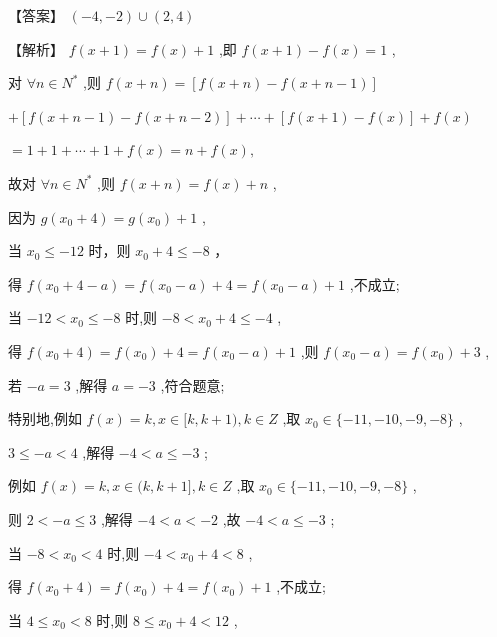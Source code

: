 \documentclass[10pt]{article}
\begin{document}
【答案】 \(\left( {-4, - 2}\right)  \cup  \left( {2,4}\right)\)

【解析】 \(f\left( {x + 1}\right)  = f\left( x\right)  + 1\) ,即 \(f\left( {x + 1}\right)  - f\left( x\right)  = 1\) ,

对 \(\forall n \in  {N}^{ * }\) ,则 \(f\left( {x + n}\right)  = \left\lbrack  {f\left( {x + n}\right)  - f\left( {x + n - 1}\right) }\right\rbrack\)

\(+ \left\lbrack  {f\left( {x + n - 1}\right)  - f\left( {x + n - 2}\right) }\right\rbrack   + \cdots  + \left\lbrack  {f\left( {x + 1}\right)  - f\left( x\right) }\right\rbrack   + f\left( x\right)\)

\(= 1 + 1 + \cdots  + 1 + f\left( x\right)  = n + f\left( x\right) ,\)

故对 \(\forall n \in  {N}^{ * }\) ,则 \(f\left( {x + n}\right)  = f\left( x\right)  + n\) ,

因为 \(g\left( {{x}_{0} + 4}\right)  = g\left( {x}_{0}\right)  + 1\) ,

当 \({x}_{0} \leq   - {12}\) 时，则 \({x}_{0} + 4 \leq   - 8\) ，

得 \(f\left( {{x}_{0} + 4 - a}\right)  = f\left( {{x}_{0} - a}\right)  + 4 = f\left( {{x}_{0} - a}\right)  + 1\) ,不成立;

当 \(- {12} < {x}_{0} \leq   - 8\) 时,则 \(- 8 < {x}_{0} + 4 \leq   - 4\) ,

得 \(f\left( {{x}_{0} + 4}\right)  = f\left( {x}_{0}\right)  + 4 = f\left( {{x}_{0} - a}\right)  + 1\) ,则 \(f\left( {{x}_{0} - a}\right)  = f\left( {x}_{0}\right)  + 3\) ,

若 \(- a = 3\) ,解得 \(a =  - 3\) ,符合题意;

特别地,例如 \(f\left( x\right)  = k,x \in  \lbrack k,k + 1),k \in  Z\) ,取 \({x}_{0} \in  \{  - {11}, - {10}, - 9, - 8\}\) ,

\(3 \leq   - a < 4\) ,解得 \(- 4 < a \leq   - 3\) ;

例如 \(f\left( x\right)  = k,x \in  (k,k + 1\rbrack ,k \in  Z\) ,取 \({x}_{0} \in  \{  - {11}, - {10}, - 9, - 8\}\) ,

则 \(2 <  - a \leq  3\) ,解得 \(- 4 < a <  - 2\) ,故 \(- 4 < a \leq   - 3\) ;

当 \(- 8 < {x}_{0} < 4\) 时,则 \(- 4 < {x}_{0} + 4 < 8\) ,

得 \(f\left( {{x}_{0} + 4}\right)  = f\left( {x}_{0}\right)  + 4 = f\left( {x}_{0}\right)  + 1\) ,不成立;

当 \(4 \leq  {x}_{0} < 8\) 时,则 \(8 \leq  {x}_{0} + 4 < {12}\) ,
\end{document}
